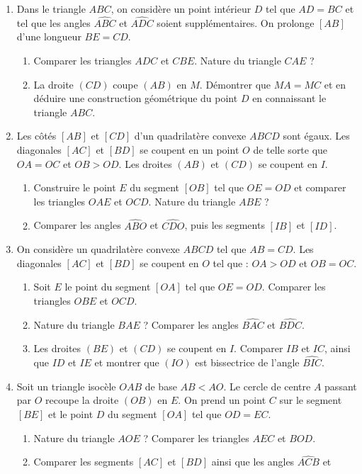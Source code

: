 \begin{enumerate}
\item Dans le triangle $ABC$, on considère un point intérieur $D$ tel que $AD=BC$ et tel que les angles $\widehat{ABC}$ et $\widehat{ADC}$ soient supplémentaires. On
prolonge $[AB]$ d'une longueur $BE=CD$.\begin{enumerate}
\item Comparer les triangles $ADC$ et $CBE$. Nature du triangle $CAE$ ? 
\item La droite $(CD)$ coupe $(AB)$ en $M$. Démontrer que $MA=MC$ et en déduire une construction géométrique du point $D$ en connaissant le triangle $ABC$. 
\end{enumerate}
\item Les côtés $[AB]$ et $[CD]$ d'un quadrilatère convexe $ABCD$ sont égaux. Les diagonales $[AC]$ et $[BD]$ se coupent en un point $O$ de telle sorte que $OA=OC$ et 
$OB>OD$. Les droites $(AB)$ et $(CD)$ se coupent en $I$. \begin{enumerate}
\item Construire le point $E$ du segment $[OB]$ tel que $OE=OD$ et comparer les triangles $OAE$ et $OCD$. Nature du triangle $ABE$ ? 
\item Comparer les angles $\widehat{ABO}$ et $\widehat{CDO}$, puis les segments $[IB]$ et $[ID]$.
\end{enumerate}
\item On considère un quadrilatère convexe $ABCD$ tel que $AB=CD$. Les diagonales 
$[AC]$ et $[BD]$ se coupent en $O$ tel que : $OA>OD$ et $OB=OC$. \begin{enumerate}
\item Soit $E$ le point du segment $[OA]$ tel que $OE=OD$. Comparer les triangles
$OBE$ et $OCD$.
\item Nature du triangle $BAE$ ? Comparer les angles $\widehat{BAC}$ et $\widehat{BDC}$.
\item Les droites $(BE)$ et $(CD)$ se coupent en $I$. Comparer $IB$ et $IC$, ainsi que $ID$ et $IE$ et montrer que $(IO)$ est bissectrice de l'angle $\widehat{BIC}$.
\end{enumerate}
\item Soit un triangle isocèle $OAB$ de base $AB<AO$. Le cercle de centre $A$ passant par $O$ recoupe la droite $(OB)$ en $E$. On prend un point $C$ sur le segment $[BE]$
et le point $D$ du segment $[OA]$ tel que $OD=EC$. \begin{enumerate}
\item Nature du triangle $AOE$ ? Comparer les triangles $AEC$ et $BOD$. 
\item Comparer les segments $[AC]$ et $[BD]$ ainsi que les angles $\widehat{ACB}$ et

\end{enumerate}
\end{enumerate}
